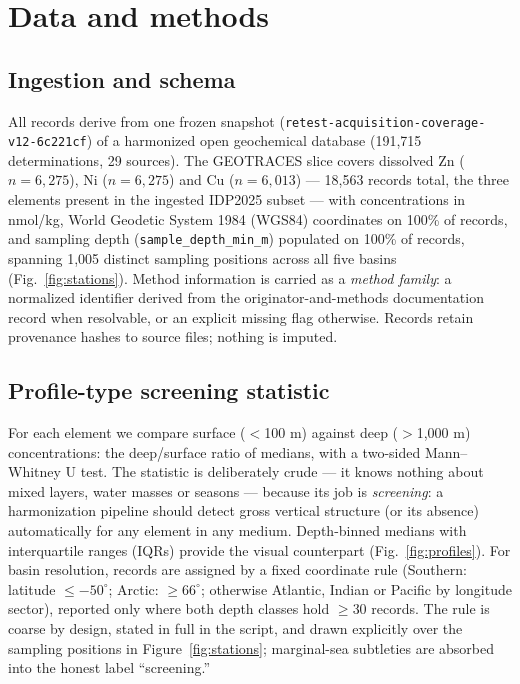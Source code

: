 \documentclass[11pt]{article}
\begin{document}
\section{Data and methods}

\subsection{Ingestion and schema}
All records derive from one frozen snapshot
(\texttt{retest-acquisition-coverage-v12-6c221cf}) of a harmonized open
geochemical database (191,715 determinations, 29 sources). The GEOTRACES
slice covers dissolved Zn ($n{=}6{,}275$), Ni ($n{=}6{,}275$) and Cu
($n{=}6{,}013$) --- 18,563 records total, the three elements present in the
ingested IDP2025 subset --- with concentrations in nmol/kg, World Geodetic
System 1984 (WGS84) coordinates on 100\% of records, and sampling depth
(\texttt{sample\_depth\_min\_m}) populated on 100\% of records, spanning
1,005 distinct sampling positions across all five basins
(Fig.~\ref{fig:stations}). Method
information is carried as a \emph{method family}: a normalized identifier
derived from the originator-and-methods documentation record when
resolvable, or an explicit missing flag otherwise. Records retain
provenance hashes to source files; nothing is imputed.

\subsection{Profile-type screening statistic}
For each element we compare surface ($<$100 m) against deep ($>$1,000 m)
concentrations: the deep/surface ratio of medians, with a two-sided
Mann--Whitney U test. The statistic is deliberately crude --- it knows
nothing about mixed layers, water masses or seasons --- because its job is
\emph{screening}: a harmonization pipeline should detect gross vertical
structure (or its absence) automatically for any element in any medium.
Depth-binned medians with interquartile ranges (IQRs) provide the visual
counterpart (Fig.~\ref{fig:profiles}). For basin resolution, records are
assigned by a fixed coordinate rule (Southern: latitude $\le -50^{\circ}$;
Arctic: $\ge 66^{\circ}$; otherwise Atlantic, Indian or Pacific by
longitude sector), reported only where both depth classes hold $\ge$30
records. The rule is coarse by design, stated in full in the script, and
drawn explicitly over the sampling positions in Figure~\ref{fig:stations};
marginal-sea subtleties are absorbed into the honest label ``screening.''
\end{document}

